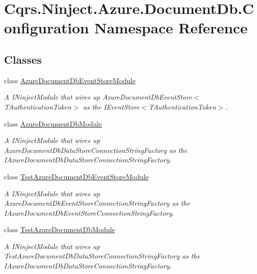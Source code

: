 \hypertarget{namespaceCqrs_1_1Ninject_1_1Azure_1_1DocumentDb_1_1Configuration}{}\section{Cqrs.\+Ninject.\+Azure.\+Document\+Db.\+Configuration Namespace Reference}
\label{namespaceCqrs_1_1Ninject_1_1Azure_1_1DocumentDb_1_1Configuration}
\subsection*{Classes}
\begin{DoxyCompactItemize}
\item 
class \hyperlink{classCqrs_1_1Ninject_1_1Azure_1_1DocumentDb_1_1Configuration_1_1AzureDocumentDbEventStoreModule}{Azure\+Document\+Db\+Event\+Store\+Module}
\begin{DoxyCompactList}\small\item\em A I\+Ninject\+Module that wires up Azure\+Document\+Db\+Event\+Store$<$\+T\+Authentication\+Token$>$ as the I\+Event\+Store$<$\+T\+Authentication\+Token$>$. \end{DoxyCompactList}\item 
class \hyperlink{classCqrs_1_1Ninject_1_1Azure_1_1DocumentDb_1_1Configuration_1_1AzureDocumentDbModule}{Azure\+Document\+Db\+Module}
\begin{DoxyCompactList}\small\item\em A I\+Ninject\+Module that wires up Azure\+Document\+Db\+Data\+Store\+Connection\+String\+Factory as the I\+Azure\+Document\+Db\+Data\+Store\+Connection\+String\+Factory. \end{DoxyCompactList}\item 
class \hyperlink{classCqrs_1_1Ninject_1_1Azure_1_1DocumentDb_1_1Configuration_1_1TestAzureDocumentDbEventStoreModule}{Test\+Azure\+Document\+Db\+Event\+Store\+Module}
\begin{DoxyCompactList}\small\item\em A I\+Ninject\+Module that wires up Azure\+Document\+Db\+Event\+Store\+Connection\+String\+Factory as the I\+Azure\+Document\+Db\+Event\+Store\+Connection\+String\+Factory. \end{DoxyCompactList}\item 
class \hyperlink{classCqrs_1_1Ninject_1_1Azure_1_1DocumentDb_1_1Configuration_1_1TestAzureDocumentDbModule}{Test\+Azure\+Document\+Db\+Module}
\begin{DoxyCompactList}\small\item\em A I\+Ninject\+Module that wires up Test\+Azure\+Document\+Db\+Data\+Store\+Connection\+String\+Factory as the I\+Azure\+Document\+Db\+Data\+Store\+Connection\+String\+Factory. \end{DoxyCompactList}\end{DoxyCompactItemize}
